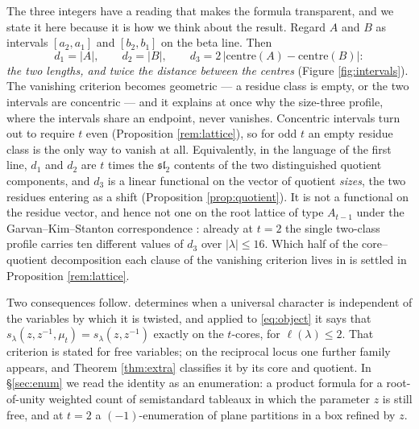 \documentclass[11pt,reqno]{amsart}
\theoremstyle{plain}
\theoremstyle{definition}
\newcommand{\zt}{\mu_t}
\begin{document}
The three integers have a reading that makes the formula transparent, and we state it here because it
is how we think about the result. Regard $A$ and $B$ as intervals $[a_2,a_1]$ and $[b_2,b_1]$ on the
beta line. Then
\begin{equation}\label{eq:intervals}
d_1=|A|,\qquad d_2=|B|,\qquad d_3=2\,\bigl|\mathrm{centre}(A)-\mathrm{centre}(B)\bigr| :
\end{equation}
\emph{the two lengths, and twice the distance between the centres} (Figure \ref{fig:intervals}). The
vanishing criterion becomes geometric --- a residue class is empty, or the two intervals are
concentric --- and it explains at once why the size-three profile, where the intervals share an
endpoint, never vanishes. Concentric intervals turn out to require $t$ even (Proposition
\ref{rem:lattice}), so for odd $t$ an empty residue class is the only way to vanish at all. Equivalently, in the language of the first line, $d_1$ and $d_2$ are $t$
times the $\mathfrak{sl}_2$ contents of the two distinguished quotient components, and $d_3$ is a
linear functional on the vector of quotient \emph{sizes}, the two residues entering as a shift
(Proposition \ref{prop:quotient}). It is not a functional on the residue vector, and hence not one
on the root lattice of type $A_{t-1}$ under the Garvan--Kim--Stanton correspondence \cite{GKS90}:
already at $t=2$ the single two-class profile carries ten different values of $d_3$ over
$|\lambda|\le16$. Which half of the core--quotient decomposition each clause of the vanishing
criterion lives in is settled in Proposition \ref{rem:lattice}.

Two consequences follow. \cite[Theorem 5.3]{AK25} determines when a universal character is
independent of the variables by which it is twisted, and applied to \eqref{eq:object} it says that
$s_\lambda(z,z^{-1},\zt)=s_\lambda(z,z^{-1})$ exactly on the $t$-cores, for $\ell(\lambda)\le2$. That
criterion is stated for free variables; on the reciprocal locus one further family appears, and
Theorem \ref{thm:extra} classifies it by its core and quotient. In \S\ref{sec:enum} we read the
identity as an enumeration: a product formula for a root-of-unity weighted count of semistandard
tableaux in which the parameter $z$ is still free, and at $t=2$ a $(-1)$-enumeration of plane
partitions in a box refined by $z$.
\end{document}
